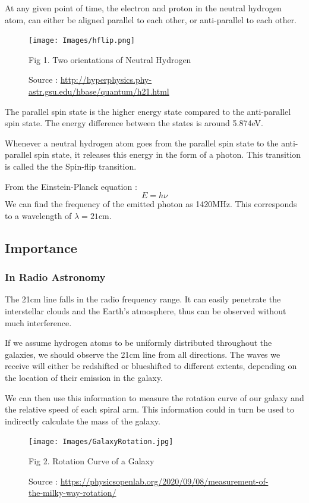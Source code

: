 \documentclass[12pt]{article}
\begin{document}
At any given point of time, the electron and proton in the neutral hydrogen atom, can either be aligned parallel to each other, or anti-parallel to each other. 
\begin{figure}[H]
  \centering
  \texttt{[image: Images/hflip.png]}
  \caption{Fig 1. Two orientations of Neutral Hydrogen}
  \caption{\tiny Source : \url{http://hyperphysics.phy-astr.gsu.edu/hbase/quantum/h21.html}}
\end{figure}

The parallel spin state is the higher energy state compared to the anti-parallel spin state. The energy difference between the states is around 5.874eV. \linebreak

Whenever a neutral hydrogen atom goes from the parallel spin state to the anti-parallel spin state, it releases this energy in the form of a photon. This transition is called the the Spin-flip transition. \linebreak

From the Einstein-Planck equation :
\begin{equation}
  E=h \nu \label{eq:1}
\end{equation}
We can find the frequency of the emitted photon as 1420MHz. This corresponds to a wavelength of $\lambda=21$cm. 
\subsection{Importance}
\subsubsection{In Radio Astronomy} %
The 21cm line falls in the radio frequency range. It can easily penetrate the interstellar clouds and the Earth's atmosphere, thus can be observed without much interference. \linebreak

If we assume hydrogen atoms to be uniformly distributed throughout the galaxies, we should observe the 21cm line from all directions. The waves we receive will either be redshifted or blueshifted to different extents, depending on the location of their emission in the galaxy. \linebreak

We can then use this information to measure the rotation curve of our galaxy and the relative speed of each spiral arm. This information could in turn be used to indirectly calculate the mass of the galaxy. 
\begin{figure}[H]
  \centering
  \texttt{[image: Images/GalaxyRotation.jpg]}
  \caption{Fig 2. Rotation Curve of a Galaxy}
  \caption{\tiny Source : \url{https://physicsopenlab.org/2020/09/08/measurement-of-the-milky-way-rotation/}}
\end{figure}
\end{document}
